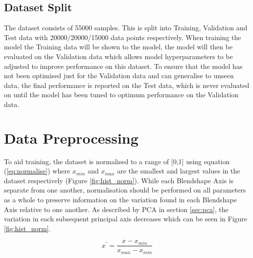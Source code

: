 \subsection{Dataset Split}
The dataset consists of 55000 samples.
This is split into Training, Validation and Test data with 20000/20000/15000 data points respectively.
When training the model the Training data will be shown to the model, the model will then be evaluated on the Validation data which allows model hyperparameters to be adjusted to improve performance on this dataset.
To ensure that the model has not been optimised just for the Validation data and can generalise to unseen data, the final performance is reported on the Test data, which is never evaluated on until the model has been tuned to optimum performance on the Validation data.

\section{Data Preprocessing}
To aid training, the dataset is normalised to a range of [0,1] using equation (\ref{eq:normalise}) where $x_{min}$ and $x_{max}$ are the smallest and largest values in the dataset respectively (Figure \ref{fig:hist_norm}).
While each Blendshape Axis is separate from one another, normalisation should be performed on all parameters as a whole to preserve information on the variation found in each Blendshape Axis relative to one another.
As described by PCA in section \ref{sec:pca}, the variation in each subsequent principal axis decreases which can be seen in Figure \ref{fig:hist_norm}.

\begin{equation}\label{eq:normalise}
   x^\prime = \frac{x - x_{min}}{x_{max} - x_{min}} 
\end{equation}


